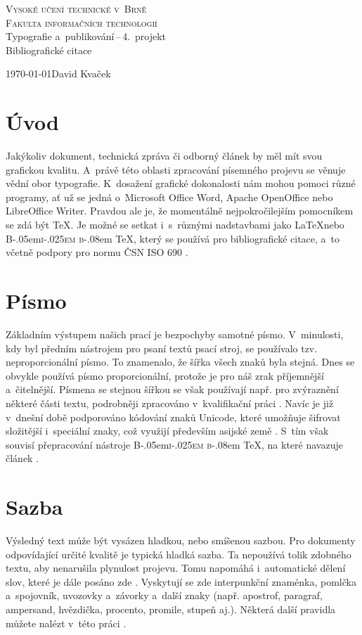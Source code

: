 \documentclass[a4paper, 11pt]{article}
\DeclareRobustCommand{\BibTeX}{{\normalfont B\kern-.05em{\scshape i\kern-.025em b}\kern-.08em \TeX}}
\begin{document}
\begin{titlepage}
    \begin{center}
        \Huge\textsc{Vysoké učení technické v~Brně} \\
        \huge\textsc{Fakulta informačních technologií} \\
        \LARGE{Typografie a~publikování\,--\,4.~projekt} \\
        \Huge{Bibliografické citace} \\
    \end{center}
    \Large{\today \hfill David Kvaček}
\end{titlepage}

\section*{Úvod}
Jakýkoliv dokument, technická zpráva či odborný článek by měl mít svou grafickou kvalitu.
A~právě této oblasti zpracování písemného projevu se věnuje vědní obor typografie.
K~dosažení grafické dokonalosti nám mohou pomoci různé programy, ať už se jedná o~Microsoft Office Word, Apache OpenOffice nebo LibreOffice Writer.
Pravdou ale je, že momentálně nejpokročilejším pomocníkem se zdá být \TeX.
Je možné se setkat i~s~různými nadstavbami jako \LaTeX nebo \BibTeX , který se používá pro bibliografické citace, a~to včetně podpory pro normu ČSN ISO 690 \cite{Martinek2008}.

\section{Písmo}
Základním výstupem našich prací je bezpochyby samotné písmo.
V~minulosti, kdy byl předním nástrojem pro psaní textů psací stroj, se používalo tzv. neproporcionální písmo.
To znamenalo, že šířka všech znaků byla stejná.
Dnes se obvykle používá písmo proporcionální, protože je pro náš zrak příjemnější a~čitelnější.
Písmena se stejnou šířkou se však používají např. pro zvýraznění některé části textu, podrobněji zpracováno v~kvalifikační práci \cite{MUNI2011}.
Navíc je již v~dnešní době podporováno kódování znaků Unicode, které umožňuje šifrovat složitější i~speciální znaky, což využijí především asijské země \cite{Asia2008a}.
S~tím však souvisí přepracování nástroje \BibTeX, na které navazuje článek \cite{Asia2008b}.

\section{Sazba}
Výsledný text může být vysázen hladkou, nebo smíšenou sazbou.
Pro dokumenty odpovídající určité kvalitě je typická hladká sazba.
Ta nepoužívá tolik zdobného textu, aby nenarušila plynulost projevu.
Tomu napomáhá i~automatické dělení slov, které je dále posáno zde \cite{Olsak2014}.
Vyskytují se zde interpunkční znaménka, pomlčka a~spojovník, uvozovky a~závorky a~další znaky (např. apostrof, paragraf, ampersand, hvězdička, procento, promile, stupeň aj.).
Některá další pravidla můžete nalézt v~této práci \cite{VSPJ2021}.
\end{document}
